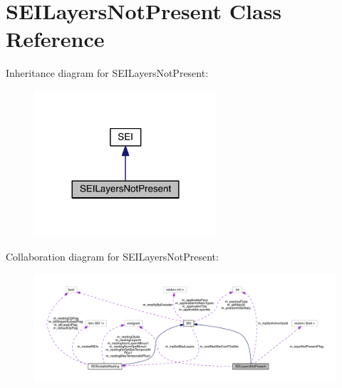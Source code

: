 \hypertarget{class_s_e_i_layers_not_present}{}\section{S\+E\+I\+Layers\+Not\+Present Class Reference}
\label{class_s_e_i_layers_not_present}


Inheritance diagram for S\+E\+I\+Layers\+Not\+Present\+:
\nopagebreak
\begin{figure}[H]
\begin{center}
\leavevmode
\includegraphics[width=192pt]{dc/d7e/class_s_e_i_layers_not_present__inherit__graph}
\end{center}
\end{figure}


Collaboration diagram for S\+E\+I\+Layers\+Not\+Present\+:
\nopagebreak
\begin{figure}[H]
\begin{center}
\leavevmode
\includegraphics[width=350pt]{d1/d5b/class_s_e_i_layers_not_present__coll__graph}
\end{center}
\end{figure}
